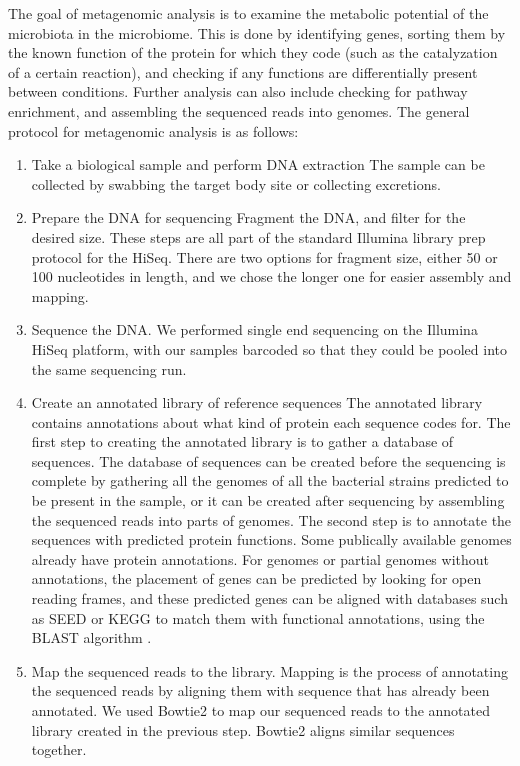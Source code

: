 The goal of metagenomic analysis is to examine the metabolic potential of the microbiota in the microbiome. This is done by identifying genes, sorting them by the known function of the protein for which they code (such as the catalyzation of a certain reaction), and checking if any functions are differentially present between conditions. Further analysis can also include checking for pathway enrichment, and assembling the sequenced reads into genomes. The general protocol for metagenomic analysis is as follows:

\begin{enumerate}
\item Take a biological sample and perform DNA extraction
The sample can be collected by swabbing the target body site or collecting excretions.

\item Prepare the DNA for sequencing
Fragment the DNA, and filter for the desired size. These steps are all part of the standard Illumina library prep protocol for the HiSeq. There are two options for fragment size, either 50 or 100 nucleotides in length, and we chose the longer one for easier assembly and mapping.

\item Sequence the DNA.
We performed single end sequencing on the Illumina HiSeq platform, with our samples barcoded so that they could be pooled into the same sequencing run.

\item Create an annotated library of reference sequences
The annotated library contains annotations about what kind of protein each sequence codes for. The first step to creating the annotated library is to gather a database of sequences. The database of sequences can be created before the sequencing is complete by gathering all the genomes of all the bacterial strains predicted to be present in the sample, or it can be created after sequencing by assembling the sequenced reads into parts of genomes. The second step is to annotate the sequences with predicted protein functions. Some publically available genomes already have protein annotations. For genomes or partial genomes without annotations, the placement of genes can be predicted by looking for open reading frames, and these predicted genes can be aligned with databases such as SEED \cite{overbeek2005subsystems} or KEGG \cite{kanehisa2000kegg} to match them with functional annotations, using the BLAST algorithm \cite{altschul1990basic}.

\item Map the sequenced reads to the library.
Mapping is the process of annotating the sequenced reads by aligning them with sequence that has already been annotated. We used Bowtie2 \cite{langmead2012fast} to map our sequenced reads to the annotated library created in the previous step. Bowtie2 aligns similar sequences together.


\end{enumerate}
